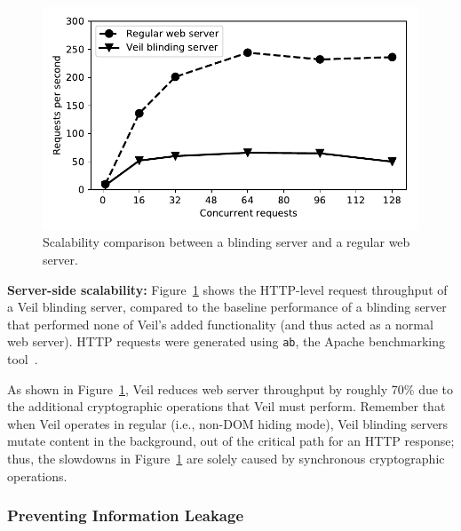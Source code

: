 \begin{figure}
	\centering
	\includegraphics[width=\textwidth]{veil-figs/scalability_mit.pdf}
	\caption{Scalability comparison between a blinding server
		and a regular web server.}
	\label{fig:scalability}
\end{figure}

\noindent
\textbf{Server-side scalability:}
Figure~\ref{fig:scalability} shows the HTTP-level
request throughput of a Veil blinding server,
compared to the baseline performance of a blinding
server that performed none of Veil's added functionality
(and thus acted as a normal web server).
HTTP requests were generated using \texttt{ab}, the Apache
benchmarking tool~\cite{ab}.

As shown in Figure~\ref{fig:scalability}, Veil
reduces web server throughput by roughly 70\%
due to the additional cryptographic operations
that Veil must perform. Remember that when
Veil operates in regular (i.e., non-DOM hiding
mode), Veil blinding servers mutate content in
the background, out of the critical path for an
HTTP response; thus, the slowdowns in Figure~\ref{fig:scalability}
are solely caused by synchronous cryptographic
operations.

\subsubsection{Preventing Information Leakage}
\label{sec:privLeaks}

